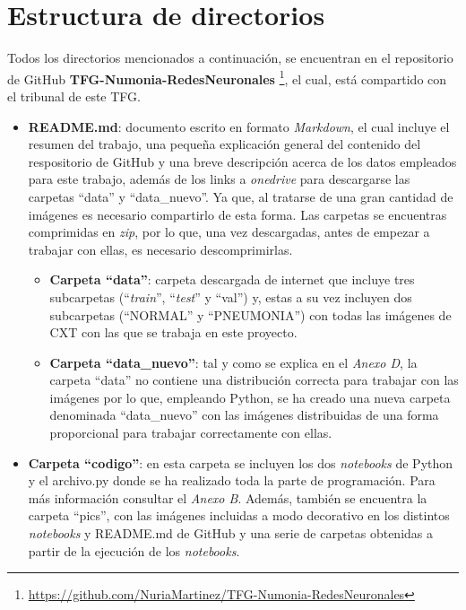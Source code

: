 
\section{Estructura de directorios}

Todos los directorios mencionados a continuación, se encuentran en el repositorio de GitHub \textbf {TFG-Numonia-RedesNeuronales} \footnote{\url{https://github.com/NuriaMartinez/TFG-Numonia-RedesNeuronales}}, el cual, está compartido con el tribunal de este TFG.
\begin{itemize}
    
    \item \textbf{README.md}: documento escrito en formato \textit {Markdown}, el cual incluye el resumen del trabajo, una pequeña explicación general del contenido del respositorio de GitHub y una breve descripción acerca de los datos empleados para este trabajo, además de los links a \textit{onedrive}  para descargarse las carpetas ``data'' y ``data\_nuevo''. Ya que, al tratarse de una gran cantidad de imágenes es necesario compartirlo de esta forma. Las carpetas se encuentras comprimidas en \textit{zip}, por lo que, una vez descargadas, antes de empezar a trabajar con ellas, es necesario descomprimirlas.
    \begin{itemize}
        \item \textbf{Carpeta ``data''}: carpeta descargada de internet que incluye tres subcarpetas (``\textit{train}'', ``\textit{test}'' y ``val'') y, estas a su vez incluyen dos subcarpetas (``NORMAL'' y ``PNEUMONIA'') con todas las imágenes de CXT con las que se trabaja en este proyecto.
        \item \textbf{Carpeta ``data\_nuevo''}: tal y como se explica en el \textit{Anexo D}, la carpeta ``data'' no contiene una distribución correcta para trabajar con las imágenes por lo que, empleando Python, se ha creado una nueva carpeta denominada ``data\_nuevo'' con las imágenes distribuidas de una forma proporcional para trabajar correctamente con ellas.
    \end{itemize}
    
    \item \textbf{Carpeta ``codigo''}: en esta carpeta se incluyen los dos \textit{notebooks} de Python y el archivo.py donde se ha realizado toda la parte de programación. Para más información consultar el \textit{Anexo B}. Además, también se encuentra la carpeta ``pics'', con las imágenes incluidas a modo decorativo en los distintos \textit{notebooks} y README.md de GitHub y una serie de carpetas obtenidas a partir de la ejecución de los \textit{notebooks}. 
    

\end{itemize}
